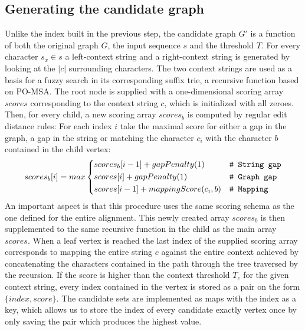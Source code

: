\documentclass[thesis.tex]{subfiles}
\begin{document}
\subsection{Generating the candidate graph}
Unlike the index built in the previous step, the candidate graph $G'$ is a function of both the original graph $G$, the input sequence $s$ and the threshold $T$. For every character $s_x \in s$ a left-context string and a right-context string is generated by looking at the $|c|$ surrounding characters. The two context strings are used as a basis for a fuzzy search in its corresponding suffix trie, a recursive function based on PO-MSA. The root node is supplied with a one-dimensional scoring array $scores$ corresponding to the context string $c$, which is initialized with all zeroes. Then, for every child, a new scoring array $scores_b$ is computed by regular edit distance rules: For each index $i$ take the maximal score for either a gap in the graph, a gap in the string or matching the character $c_i$ with the character $b$ contained in the child vertex:
\begin{equation}
  scores_b[i] = max \begin{dcases}
    scores_b[i - 1] + gapPenalty(1) & \text{\texttt{\# String gap}}\\
    scores[i] + gapPenalty(1) & \text{\texttt{\# Graph gap}}\\
    scores[i - 1] + mappingScore(c_i, b) & \text{\texttt{\# Mapping}}\\
  \end{dcases}
\end{equation} 
An important aspect is that this procedure uses the same scoring schema as the one defined for the entire alignment. This newly created array $scores_b$ is then supplemented to the same recursive function in the child as the main array $scores$. When a leaf vertex is reached the last index of the supplied scoring array corresponds to mapping the entire string $c$ against the entire context achieved by concatenating the characters contained in the path through the tree traversed by the recursion. If the score is higher than the context threshold $T_c$ for the given context string, every index contained in the vertex is stored as a pair on the form $\{index, score\}$. The candidate sets are implemented as maps with the index as a key, which allows us to store the index of every candidate exactly vertex once by only saving the pair which produces the highest value.\\
\par\noindent
\end{document}
